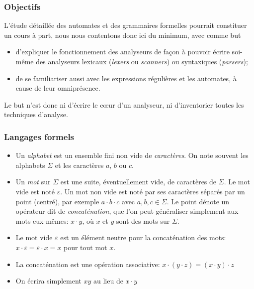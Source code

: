 %
\begin{frame}
\frametitle{Objectifs}

L'étude détaillée des automates et des grammaires formelles pourrait
constituer un cours à part, nous nous contentons donc ici du minimum,
avec comme but

\begin{itemize}

  \item d'expliquer le fonctionnement des analyseurs de
  façon à pouvoir écrire soi-même des analyseurs lexicaux
  (\emph{lexers} ou \emph{scanners}) ou syntaxiques (\emph{parsers});

  \item de se familiariser aussi avec les expressions
  régulières et les automates, à cause de leur omniprésence.

\end{itemize}
Le but n'est donc ni d'écrire le c{\oe}ur d'un analyseur, ni
d'inventorier toutes les techniques d'analyse.

\end{frame}

%
\begin{frame}
\frametitle{Langages formels}

\begin{itemize}

  \item Un \emph{alphabet} est un ensemble fini non vide de
  \emph{caractères}. On note souvent les alphabets $\Sigma$ et les
  caractères $a$, $b$ ou $c$.

  \item Un \emph{mot} sur $\Sigma$ est une suite,
  éventuellement vide, de caractères de $\Sigma$. Le mot vide est noté
  $\varepsilon$. Un mot non vide est noté par ses caractères séparés
  par un point (centré), par exemple $a \cdot b \cdot c$ avec $a, b, c
  \in \Sigma$. Le point dénote un opérateur dit de
  \emph{concaténation}, que l'on peut généraliser simplement aux mots
  eux-mêmes: $x \cdot y$, où $x$ et $y$ sont des mots sur $\Sigma$.

  \item Le mot vide $\varepsilon$ est un élément neutre
  pour la concaténation des mots: $x \cdot \varepsilon = \varepsilon
  \cdot x = x$ pour tout mot $x$.

  \item La concaténation est une opération associative: $x
    \cdot (y \cdot z) = (x \cdot y) \cdot z$

  \item On écrira simplement $xy$ au lieu de $x \cdot y$
\end{itemize}

\end{frame}


